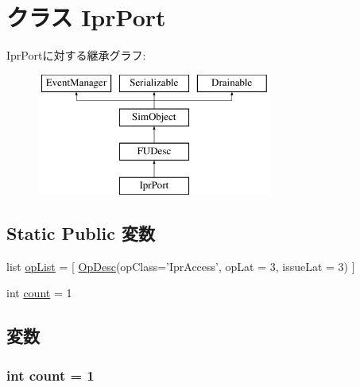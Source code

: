 \hypertarget{classFuncUnitConfig_1_1IprPort}{
\section{クラス IprPort}
\label{classFuncUnitConfig_1_1IprPort}
}
IprPortに対する継承グラフ:\begin{figure}[H]
\begin{center}
\leavevmode
\includegraphics[height=4cm]{classFuncUnitConfig_1_1IprPort}
\end{center}
\end{figure}
\subsection*{Static Public 変数}
\begin{DoxyCompactItemize}
\item 
list \hyperlink{classFuncUnitConfig_1_1IprPort_a31b2f9e3ac9a504397b140f513c469cc}{opList} = \mbox{[} \hyperlink{classOpDesc}{OpDesc}(opClass='IprAccess', opLat = 3, issueLat = 3) \mbox{]}
\item 
int \hyperlink{classFuncUnitConfig_1_1IprPort_ad43c3812e6d13e0518d9f8b8f463ffcf}{count} = 1
\end{DoxyCompactItemize}


\subsection{変数}
\hypertarget{classFuncUnitConfig_1_1IprPort_ad43c3812e6d13e0518d9f8b8f463ffcf}{
\subsubsection[{count}]{\setlength{\rightskip}{0pt plus 5cm}int {\bf count} = 1}}
\label{classFuncUnitConfig_1_1IprPort_ad43c3812e6d13e0518d9f8b8f463ffcf}


